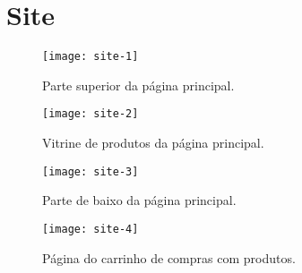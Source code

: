 \chapter{Site}

\begin{figure}[ht]
  \centering
  \texttt{[image: site-1]}
  \caption{Parte superior da página principal.}
  \label{site-1}
\end{figure}

\begin{figure}[ht]
  \centering
  \texttt{[image: site-2]}
  \caption{Vitrine de produtos da página principal.}
  \label{site-2}
\end{figure}

\begin{figure}[ht]
  \centering
  \texttt{[image: site-3]}
  \caption{Parte de baixo da página principal.}
  \label{site-3}
\end{figure}

\begin{figure}[ht]
  \centering
  \texttt{[image: site-4]}
  \caption{Página do carrinho de compras com produtos.}
  \label{site-4}
\end{figure}
